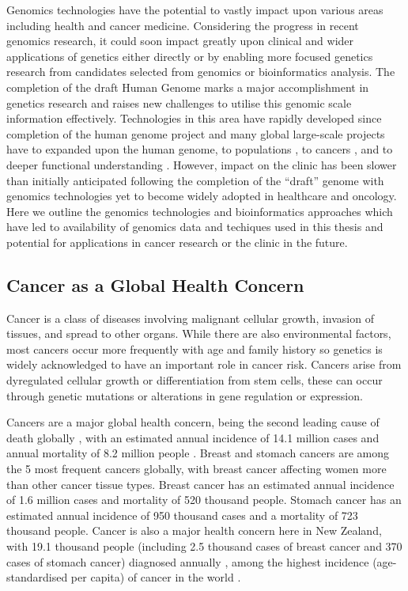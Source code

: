 Genomics technologies have the potential to vastly impact upon various areas including health and cancer medicine. Considering the progress in recent genomics research, it could soon impact greatly upon clinical and wider applications of genetics either directly or by enabling more focused genetics research from candidates selected from genomics or bioinformatics analysis. The completion of the draft Human Genome \citep{Lander2001} marks a major accomplishment in genetics research and raises new challenges to utilise this genomic scale information effectively. Technologies in this area have rapidly developed since completion of the human genome project and many global large-scale projects have to expanded upon the human genome, to populations \citep{1000Genomes2010}, to cancers \citep{Dickson1999, ICGC2011}, and to deeper functional understanding \citep{ENCODE2004, FANTOM2001}. However, impact on the clinic has been slower than initially anticipated following the completion of the ``draft'' genome with genomics technologies yet to become widely adopted in healthcare and oncology. Here we outline the genomics technologies and bioinformatics approaches which have led to availability of genomics data and techiques used in this thesis and potential for applications in cancer research or the clinic in the future. 

\subsection{Cancer as a Global Health Concern}

Cancer is a class of diseases involving malignant cellular growth, invasion of tissues, and spread to other organs. While there are also environmental factors, most cancers occur more frequently with age and family history so genetics is widely acknowledged to have an important role in cancer risk. Cancers arise from dyregulated cellular growth or differentiation from stem cells, these can occur through genetic mutations or alterations in gene regulation or expression.

Cancers are a major global health concern, being the second leading cause of death globally \citep{WorldHealthOrg2017}, with an estimated annual incidence of 14.1 million cases and annual mortality of 8.2 million people \citep{Ferlay2015}. Breast and stomach cancers are among the 5 most frequent cancers globally, with breast cancer affecting women more than other cancer tissue types. Breast cancer has an estimated annual incidence of 1.6 million cases and mortality of 520 thousand people. Stomach cancer has an estimated annual incidence of 950 thousand cases and a mortality of 723 thousand people. Cancer is also a major health concern here in New Zealand, with 19.1 thousand people (including 2.5 thousand cases of breast cancer and 370 cases of stomach cancer) diagnosed annually \citep{CIX2013}, among the highest incidence (age-standardised per capita) of cancer in the world \citep{Ferlay2015}.   

